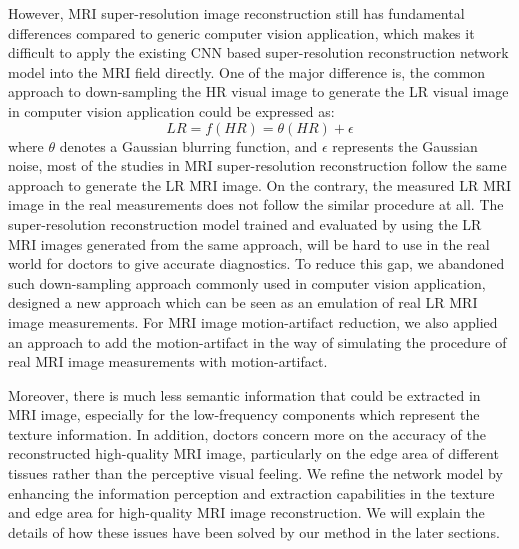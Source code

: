 \documentclass[runningheads]{llncs}
\begin{document}
However, MRI super-resolution image reconstruction still has fundamental differences compared to generic computer vision application, which makes it difficult to apply the existing CNN based super-resolution reconstruction network model into the MRI field directly. One of the major difference is, the common approach to down-sampling the HR visual image to generate the LR visual image in computer vision application could be expressed as:
\begin{equation}
LR = f(HR) = \theta(HR) + \epsilon
\end{equation}
where $\theta$ denotes a Gaussian blurring function, and $\epsilon$ represents the Gaussian noise, most of the studies in MRI super-resolution reconstruction follow the same approach to generate the LR MRI image. On the contrary, the measured LR MRI image in the real measurements does not follow the similar procedure at all. The super-resolution reconstruction model trained and evaluated by using the LR MRI images generated from the same approach, will be hard to use in the real world for doctors to give accurate diagnostics. To reduce this gap, we abandoned such down-sampling approach commonly used in computer vision application, designed a new approach which can be seen as an emulation of real LR MRI image measurements. For MRI image motion-artifact reduction, we also applied an approach to add the motion-artifact in the way of simulating the procedure of real MRI image measurements with motion-artifact\cite{ref_mar2}. 

Moreover, there is much less semantic information that could be extracted in MRI image, especially for the low-frequency components which represent the texture information. In addition, doctors concern more on the accuracy of the reconstructed high-quality MRI image, particularly on the edge area of different tissues rather than the perceptive visual feeling. We refine the network model by enhancing the information perception and extraction capabilities in the texture and edge area for high-quality MRI image reconstruction. We will explain the details of how these issues have been solved by our method in the later sections.
\end{document}
